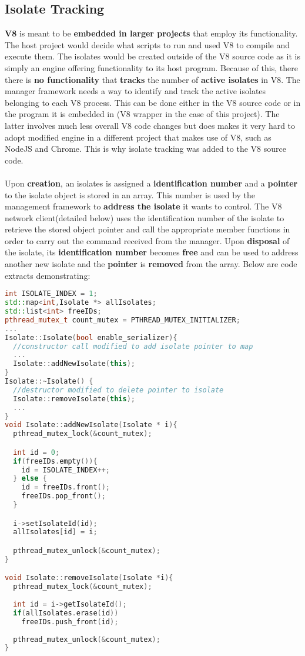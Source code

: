 \documentclass{l4proj}
\begin{document}
\subsection{Isolate Tracking}
\hspace*{3em} \textbf{V8} is meant to be \textbf{embedded in larger projects} that employ its functionality. The host project would decide what scripts to run and used V8 to compile and execute them. The isolates would be created outside of the V8 source code as it is simply an engine offering functionality to its host program. Because of this, there there is \textbf{no functionality} that \textbf{tracks} the number of \textbf{active isolates} in V8. The manager framework needs a way to identify and track the active isolates belonging to each V8 process. This can be done either in the V8 source code or in the program it is embedded in (V8 wrapper in the case of this project). The latter involves much less overall V8 code changes but does makes it very hard to adopt modified engine in a different project that makes use of V8, such as NodeJS and Chrome. This is why isolate tracking was added to the V8 source code.
\\\\
\hspace*{3em} Upon \textbf{creation}, an isolates is assigned a \textbf{identification number} and a \textbf{pointer} to the isolate object is stored in an array. This number is used by the management framework to \textbf{address the isolate} it wants to control. The V8 network client(detailed below) uses the identification number of the isolate to retrieve the stored object pointer and call the appropriate member functions in order to carry out the command received from the manager. Upon \textbf{disposal} of the isolate, its \textbf{identification number} becomes \textbf{free} and can be used to address another new isolate and the \textbf{pointer} is \textbf{removed} from the array. Below are code extracts demonstrating:
\begin{lstlisting}[language=cpp]
int ISOLATE_INDEX = 1;
std::map<int,Isolate *> allIsolates;
std::list<int> freeIDs;
pthread_mutex_t count_mutex = PTHREAD_MUTEX_INITIALIZER;
...
Isolate::Isolate(bool enable_serializer){ 
  //constructor call modified to add isolate pointer to map
  ...
  Isolate::addNewIsolate(this);
}
Isolate::~Isolate() {
  //destructor modified to delete pointer to isolate
  Isolate::removeIsolate(this);
  ...
}
void Isolate::addNewIsolate(Isolate * i){
  pthread_mutex_lock(&count_mutex);

  int id = 0;  
  if(freeIDs.empty()){
    id = ISOLATE_INDEX++;
  } else {
    id = freeIDs.front();
    freeIDs.pop_front();
  }

  i->setIsolateId(id);
  allIsolates[id] = i;

  pthread_mutex_unlock(&count_mutex);
}

void Isolate::removeIsolate(Isolate *i){
  pthread_mutex_lock(&count_mutex);
  
  int id = i->getIsolateId();
  if(allIsolates.erase(id))
    freeIDs.push_front(id);
  
  pthread_mutex_unlock(&count_mutex);
}
\end{lstlisting}
\end{document}
